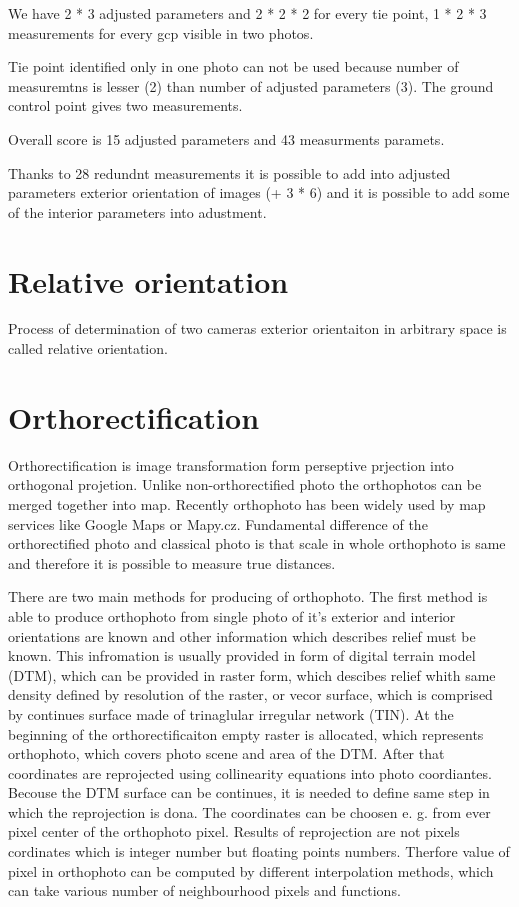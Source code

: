 \documentclass[a4paper,12pt]{report}
\begin{document}
We have 2 * 3 adjusted parameters and 2 * 2 * 2 for every tie point,  
1 * 2 * 3 measurements for every gcp visible in two photos.

Tie point identified only in one photo can not be used because number of measuremtns is lesser (2) than number of adjusted parameters (3).
The ground control point gives two measurements.


Overall score is 15 adjusted parameters and 43 measurments paramets.

Thanks to 28 redundnt measurements it is possible to add into adjusted parameters exterior orientation of images (+ 3 * 6) and it is possible to
add some of the interior parameters into adustment.  

\section{Relative orientation}

Process of determination of two cameras exterior orientaiton in arbitrary space is called relative orientation.


\section{Orthorectification}

Orthorectification is image transformation form perseptive prjection into orthogonal projetion.
Unlike non-orthorectified photo the orthophotos can be merged together into map. Recently 
orthophoto has been widely used by map services like Google Maps or Mapy.cz. Fundamental 
difference of the orthorectified photo and classical photo is that scale in whole orthophoto is same
and therefore it is possible to measure true distances. 


\label{sec:single_ortho}
There are two main methods for producing of orthophoto. The first method is able to produce orthophoto 
from single photo of it's exterior and interior orientations are known and other information which describes
relief must be known. This infromation is usually provided in form of digital terrain model (DTM), which 
can be provided in raster form, which descibes relief whith same density defined by resolution of the raster, 
or vecor surface, which is comprised by continues surface made of trinaglular irregular network (TIN).  
At the beginning of the orthorectificaiton empty raster is allocated, which represents orthophoto, 
which covers photo scene and area of the DTM. After that coordinates are reprojected using collinearity
equations into photo coordiantes. Becouse the DTM surface can be continues, it is needed to define 
same step in which the reprojection is dona. The coordinates can be choosen e. g. from ever pixel center
of the orthophoto pixel. Results of reprojection are not pixels cordinates which is integer number but 
floating points numbers. Therfore value of pixel in orthophoto can be computed by different interpolation methods,
which can take various number of neighbourhood pixels and functions.
\end{document}
